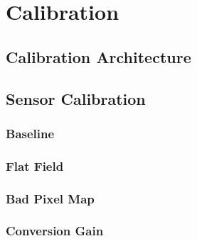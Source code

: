 \chapter{Calibration}
\label{chap:calibration}

\section{Calibration Architecture}
\label{sec:calib-architecture}


\section{Sensor Calibration}
\label{sec:calib-sensor}

\subsection{Baseline}
\label{sec:calib-baseline}


\subsection{Flat Field}
\label{sec:calib-flat-field}


\subsection{Bad Pixel Map}
\label{sec:calib-bad-pixel}


\subsection{Conversion Gain}
\label{sec:calib-conversion-gain}

